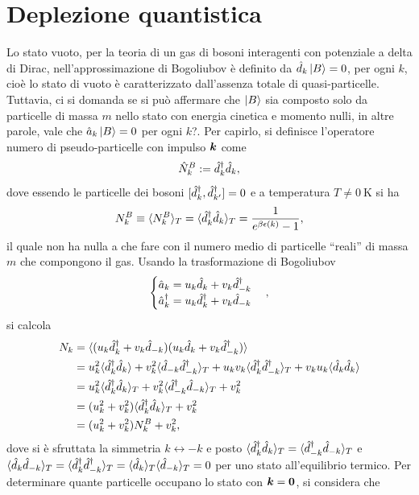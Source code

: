 \section{Deplezione quantistica}
Lo stato vuoto, per la teoria di un gas di bosoni interagenti con potenziale a delta di Dirac, nell'approssimazione di Bogoliubov è definito da $\hat{d}_k\ket{B} = 0$, per ogni $k$, cioè lo stato di vuoto è caratterizzato dall'assenza totale di quasi-particelle. Tuttavia, ci si domanda se si può affermare che $\ket{B}$ sia composto solo da particelle di massa $m$ nello stato con energia cinetica e momento nulli, in altre parole, vale che $\hat{a}_k\ket{B} = 0$ per ogni $k$?. Per capirlo, si definisce l'operatore numero di pseudo-particelle con impulso $\bm{k}$ come
\begin{equation}
    \hat{N}_k^B := \hat{d}^\dagger_k\hat{d}_k,
\end{equation}
dove essendo le particelle dei bosoni $[\hat{d}^\dagger_k,\hat{d}^\dagger_{k'}] = 0$ e a temperatura $T \neq \SI{0}{\kelvin}$ si ha
\begin{equation}
    N_k^B \equiv \langle N_k^B \rangle_T = \langle \hat{d}^\dagger_k\hat{d}_k \rangle_T = \frac{1}{e^{\beta\epsilon(k)} - 1},
\end{equation}
il quale non ha nulla a che fare con il numero medio di particelle ``reali'' di massa $m$ che compongono il gas. Usando la trasformazione di Bogoliubov
\begin{equation}
    \begin{cases}
        \hat{a}_k = u_k\hat{d}_k + v_k\hat{d}^\dagger_{-k} \\
        \hat{a}^\dagger_k = u_k\hat{d}^\dagger_k + v_k\hat{d}_{-k}
    \end{cases},
\end{equation}
si calcola
\begin{equation}
    \begin{split}
        N_k &= \langle (u_k\hat{d}^\dagger_k + v_k\hat{d}_{-k})(u_k\hat{d}_k + v_k\hat{d}^\dagger_{-k}) \rangle \\
        &= u_k^2\langle \hat{d}^\dagger_k\hat{d}_k \rangle + v_k^2\langle \hat{d}_{-k}\hat{d}^\dagger_{-k} \rangle_T + u_kv_k\langle \hat{d}^\dagger_k\hat{d}^\dagger_{-k} \rangle_T + v_ku_k\langle \hat{d}_k\hat{d}_k \rangle \\
        &= u_k^2\langle \hat{d}^\dagger_k\hat{d}_k \rangle_T + v_k^2\langle \hat{d}^\dagger_{-k}\hat{d}_{-k} \rangle_T + v_k^2 \\
        &= (u_k^2 + v_k^2)\langle \hat{d}^\dagger_k\hat{d}_k \rangle_T + v_k^2 \\
        &= (u_k^2 + v_k^2)N_k^B + v_k^2,
    \end{split}
\end{equation}
dove si è sfruttata la simmetria $k \longleftrightarrow -k$ e posto $\langle \hat{d}^\dagger_k\hat{d}_k \rangle_T = \langle \hat{d}^\dagger_{-k}\hat{d}_{-k} \rangle_T$ e $\langle \hat{d}_k\hat{d}_{-k} \rangle_T = \langle \hat{d}^\dagger_k\hat{d}^\dagger_{-k} \rangle_T = \langle \hat{d}_k \rangle_T\langle \hat{d}_{-k} \rangle_T = 0$ per uno stato all'equilibrio termico. Per determinare quante particelle occupano lo stato con $\bm{k} = \bm{0}$, si considera che
